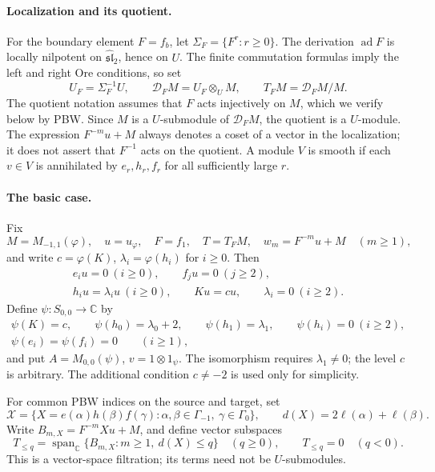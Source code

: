 \documentclass[11pt]{article}
\newcommand{\C}{\mathbb C}
\newcommand{\g}{\widehat{\mathfrak{sl}}_2}
\newcommand{\ad}{\operatorname{ad}}
\newcommand{\D}{\mathcal D}
\newcommand{\Span}{\operatorname{span}_{\C}}
\begin{document}
\paragraph{Localization and its quotient.}
For the boundary element \(F=f_b\), let \(\Sigma_F=\{F^r:r\ge0\}\).
The derivation \(\ad F\) is locally nilpotent on \(\g\), hence on \(U\).
The finite commutation formulas imply the left and right Ore conditions, so set
\[
 U_F=\Sigma_F^{-1}U,\qquad
 \D_FM=U_F\otimes_U M,\qquad T_FM=\D_FM/M.
\]
The quotient notation assumes that \(F\) acts injectively on \(M\), which
we verify below by PBW. Since \(M\) is a \(U\)-submodule of \(\D_FM\),
the quotient is a \(U\)-module.
The expression \(F^{-m}u+M\) always denotes a coset of a vector in the
localization; it does not assert that \(F^{-1}\) acts on the quotient.
A module \(V\) is smooth if each \(v\in V\) is annihilated by
\(e_r,h_r,f_r\) for all sufficiently large \(r\).

\paragraph{The basic case.}
Fix
\[
 M=M_{-1,1}(\varphi),\quad u=u_\varphi,\quad F=f_1,\quad
 T=T_FM,\quad w_m=F^{-m}u+M\quad(m\ge1),
\]
and write \(c=\varphi(K)\), \(\lambda_i=\varphi(h_i)\) for \(i\ge0\). Then
\begin{equation}\label{eq:cyclic}
\begin{gathered}
 e_i u=0\ (i\ge0),\qquad f_j u=0\ (j\ge2),\\
 h_i u=\lambda_i u\ (i\ge0),\qquad Ku=cu,\qquad \lambda_i=0\ (i\ge2).
\end{gathered}
\end{equation}
Define \(\psi:S_{0,0}\to\C\) by
\[
\begin{gathered}
 \psi(K)=c,\qquad \psi(h_0)=\lambda_0+2,\qquad
 \psi(h_1)=\lambda_1,\qquad \psi(h_i)=0\ (i\ge2),\\
 \psi(e_i)=\psi(f_i)=0\qquad(i\ge1),
\end{gathered}
\]
and put \(A=M_{0,0}(\psi)\), \(v=1\otimes1_\psi\).
The isomorphism requires \(\lambda_1\ne0\); the level \(c\) is arbitrary.
The additional condition \(c\ne-2\) is used only for simplicity.

For common PBW indices on the source and target, set
\[
 \mathcal X=\{X=e(\alpha)h(\beta)f(\gamma):
     \alpha,\beta\in\Gamma_{-1},\ \gamma\in\Gamma_0\},\qquad
 d(X)=2\ell(\alpha)+\ell(\beta).
\]
Write \(B_{m,X}=F^{-m}Xu+M\), and define vector subspaces
\begin{equation}\label{eq:filtration}
 T_{\le q}=\Span\{B_{m,X}:m\ge1,\ d(X)\le q\}\quad(q\ge0),
 \qquad T_{\le q}=0\quad(q<0).
\end{equation}
This is a vector-space filtration; its terms need not be \(U\)-submodules.
\end{document}
